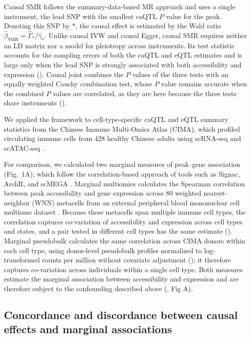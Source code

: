 \noindent Causal SMR follows the summary-data-based MR approach \cite{zhu2016smr} and uses a single instrument, the lead SNP with the smallest caQTL \(P\) value for the peak. Denoting this SNP by \(*\), the causal effect is estimated by the Wald ratio \(\hat{\beta}_{\mathrm{SMR}}=\hat{\Gamma}_*/\hat{\gamma}_*\). Unlike causal IVW and causal Egger, causal SMR requires neither an LD matrix nor a model for pleiotropy across instruments. Its test statistic accounts for the sampling errors of both the caQTL and eQTL estimates and is large only when the lead SNP is strongly associated with both accessibility and expression (). Causal joint combines the \(P\) values of the three tests with an equally weighted Cauchy combination test, whose \(P\) value remains accurate when the combined \(P\) values are correlated, as they are here because the three tests share instruments \cite{liu2020cauchy} ().

\noindent We applied the framework to cell-type-specific caQTL and eQTL summary statistics from the Chinese Immune Multi-Omics Atlas (CIMA), which profiled circulating immune cells from 428 healthy Chinese adults using scRNA-seq and scATAC-seq \cite{yin2026cima}.

\noindent For comparison, we calculated two marginal measures of peak--gene association (Fig.~1A), which follow the correlation-based approach of tools such as Signac, ArchR, and scMEGA \cite{stuart2021signac,granja2021archr,li2023scmega}. Marginal multiomics calculates the Spearman correlation between peak accessibility and gene expression across 80 weighted nearest-neighbor (WNN) metacells from an external peripheral blood mononuclear cell multiome dataset \cite{tenx2020pbmc10k,jiang2022tripod}. Because these metacells span multiple immune cell types, the correlation captures co-variation of accessibility and expression across cell types and states, and a pair tested in different cell types has the same estimate (). Marginal pseudobulk calculates the same correlation across CIMA donors within each cell type, using donor-level pseudobulk profiles normalized to log-transformed counts per million without covariate adjustment (); it therefore captures co-variation across individuals within a single cell type. Both measures estimate the marginal association between accessibility and expression and are therefore subject to the confounding described above (, Fig A).

\subsection{Concordance and discordance between causal effects and marginal associations}
\label{res:examples}

